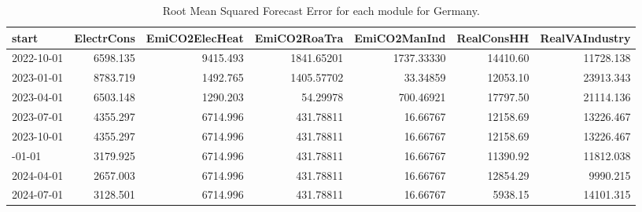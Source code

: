 \begin{table}
\centering
\caption{\label{tab:tab:RMSFE_DE}Root Mean Squared Forecast Error for each module for Germany.}
\centering
\begin{tabular}[t]{lrrrrrr}
\toprule
start & ElectrCons & EmiCO2ElecHeat & EmiCO2RoaTra & EmiCO2ManInd & RealConsHH & RealVAIndustry\\
\midrule
2022-10-01 & 6598.135 & 9415.493 & 1841.65201 & 1737.33330 & 14410.60 & 11728.138\\
2023-01-01 & 8783.719 & 1492.765 & 1405.57702 & 33.34859 & 12053.10 & 23913.343\\
2023-04-01 & 6503.148 & 1290.203 & 54.29978 & 700.46921 & 17797.50 & 21114.136\\
2023-07-01 & 4355.297 & 6714.996 & 431.78811 & 16.66767 & 12158.69 & 13226.467\\
2023-10-01 & 4355.297 & 6714.996 & 431.78811 & 16.66767 & 12158.69 & 13226.467\\
\addlinespace
2024-01-01 & 3179.925 & 6714.996 & 431.78811 & 16.66767 & 11390.92 & 11812.038\\
2024-04-01 & 2657.003 & 6714.996 & 431.78811 & 16.66767 & 12854.29 & 9990.215\\
2024-07-01 & 3128.501 & 6714.996 & 431.78811 & 16.66767 & 5938.15 & 14101.315\\
\bottomrule
\end{tabular}
\end{table}
